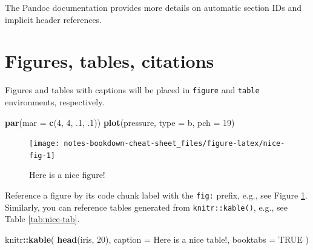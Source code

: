 \documentclass[
]{book}
\newenvironment{Shaded}{\begin{snugshade}}{\end{snugshade}}
\newcommand{\AttributeTok}[1]{\textcolor[rgb]{0.13,0.29,0.53}{#1}}
\newcommand{\ConstantTok}[1]{\textcolor[rgb]{0.56,0.35,0.01}{#1}}
\newcommand{\DecValTok}[1]{\textcolor[rgb]{0.00,0.00,0.81}{#1}}
\newcommand{\FunctionTok}[1]{\textcolor[rgb]{0.13,0.29,0.53}{\textbf{#1}}}
\newcommand{\NormalTok}[1]{#1}
\newcommand{\SpecialCharTok}[1]{\textcolor[rgb]{0.81,0.36,0.00}{\textbf{#1}}}
\newcommand{\StringTok}[1]{\textcolor[rgb]{0.31,0.60,0.02}{#1}}
\begin{document}
The Pandoc documentation provides more details on automatic section IDs and implicit header references.

\section{Figures, tables, citations}\label{figures-tables-citations}

Figures and tables with captions will be placed in \texttt{figure} and \texttt{table} environments, respectively.

\begin{Shaded}
\begin{Highlighting}[]
\FunctionTok{par}\NormalTok{(}\AttributeTok{mar =} \FunctionTok{c}\NormalTok{(}\DecValTok{4}\NormalTok{, }\DecValTok{4}\NormalTok{, .}\DecValTok{1}\NormalTok{, .}\DecValTok{1}\NormalTok{))}
\FunctionTok{plot}\NormalTok{(pressure, }\AttributeTok{type =} \StringTok{\textquotesingle{}b\textquotesingle{}}\NormalTok{, }\AttributeTok{pch =} \DecValTok{19}\NormalTok{)}
\end{Highlighting}
\end{Shaded}

\begin{figure}

{\centering \texttt{[image: notes-bookdown-cheat-sheet\_files/figure-latex/nice-fig-1]} 

}

\caption{Here is a nice figure!}\label{fig:nice-fig}
\end{figure}

Reference a figure by its code chunk label with the \texttt{fig:} prefix, e.g., see Figure \ref{fig:nice-fig}. Similarly, you can reference tables generated from \texttt{knitr::kable()}, e.g., see Table \ref{tab:nice-tab}.

\begin{Shaded}
\begin{Highlighting}[]
\NormalTok{knitr}\SpecialCharTok{::}\FunctionTok{kable}\NormalTok{(}
  \FunctionTok{head}\NormalTok{(iris, }\DecValTok{20}\NormalTok{), }\AttributeTok{caption =} \StringTok{\textquotesingle{}Here is a nice table!\textquotesingle{}}\NormalTok{,}
  \AttributeTok{booktabs =} \ConstantTok{TRUE}
\NormalTok{)}
\end{Highlighting}
\end{Shaded}
\end{document}
